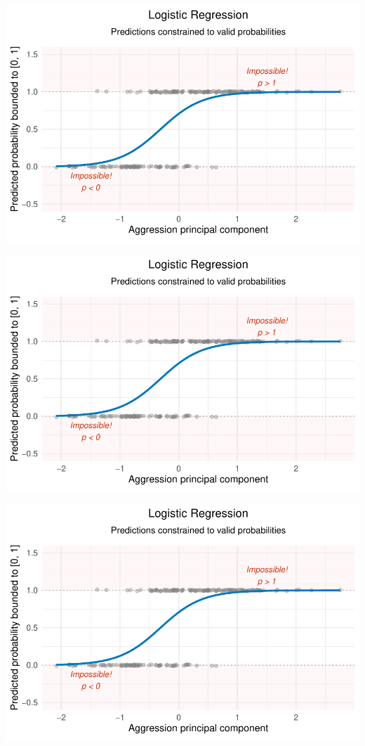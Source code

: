 \documentclass[
  letterpaper,
  DIV=11,
  numbers=noendperiod]{scrartcl}
\begin{document}
\begin{center}
\includegraphics[width=0.8\linewidth,height=\textheight,keepaspectratio]{Beyond!!!_files/figure-pdf/unnamed-chunk-4-72.pdf}
\end{center}

\begin{center}
\includegraphics[width=0.8\linewidth,height=\textheight,keepaspectratio]{Beyond!!!_files/figure-pdf/unnamed-chunk-4-73.pdf}
\end{center}

\begin{center}
\includegraphics[width=0.8\linewidth,height=\textheight,keepaspectratio]{Beyond!!!_files/figure-pdf/unnamed-chunk-4-74.pdf}
\end{center}
\end{document}
